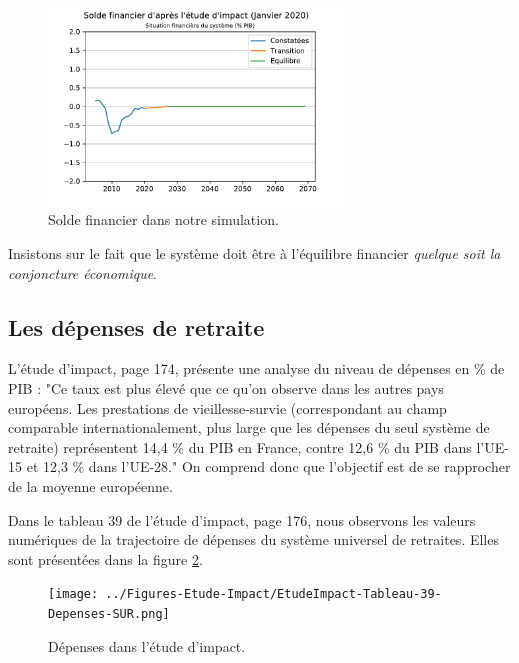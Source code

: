 \documentclass[10pt]{article}
\begin{document}
\begin{figure}
\begin{center}
\includegraphics[width=0.7\textwidth]{Simulation-Solde-Financier.pdf}
\end{center}
\caption{Solde financier dans notre simulation.}
\label{fig-solde-simulation}
\end{figure}

Insistons sur le fait que 
le système doit être à l'équilibre financier \emph{quelque soit la 
conjoncture économique}. 


\subsection{Les dépenses de retraite}

L'étude d'impact, page 174, présente une analyse du niveau de dépenses 
en \% de PIB : "Ce taux est plus élevé que ce qu’on observe dans 
les autres pays européens. Les prestations de vieillesse-survie 
(correspondant au champ comparable internationalement, plus 
large que les dépenses du seul système de retraite) représentent 
14,4 \% du PIB en France, contre 12,6 \% du PIB dans l’UE-15 et 12,3 \% dans l’UE-28."
On comprend donc que l'objectif est de se rapprocher de la moyenne européenne. 

Dans le tableau 39 de l'étude d'impact, page 176, nous observons les valeurs numériques de la trajectoire de dépenses du système universel de retraites. 
Elles sont présentées dans la figure \ref{fig-depenses-etude-impact}.

\begin{figure}
\begin{center}
\texttt{[image: ../Figures-Etude-Impact/EtudeImpact-Tableau-39-Depenses-SUR.png]}
\end{center}
\caption{Dépenses dans l'étude d'impact.}
\label{fig-depenses-etude-impact}
\end{figure}
\end{document}
